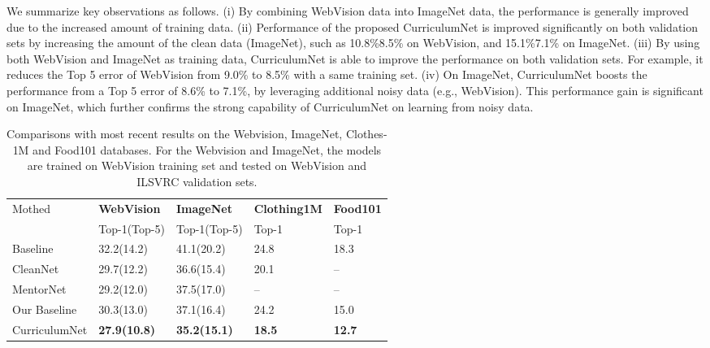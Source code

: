 \documentclass[runningheads]{llncs}
\begin{document}
We summarize key observations as follows. (i) By combining WebVision data into ImageNet data, the performance is generally improved due to the increased amount of training data. (ii) Performance of the proposed CurriculumNet is improved significantly on both validation sets by increasing the amount of the clean data (ImageNet), such as 10.8\%8.5\% on WebVision, and 15.1\%7.1\% on ImageNet. (iii) By using both WebVision and ImageNet as training data, CurriculumNet is able to improve the performance on both validation sets. For example, it reduces the Top 5 error of WebVision from 9.0\% to 8.5\% with a same training set. (iv) On ImageNet, CurriculumNet boosts the performance from a Top 5 error of 8.6\% to 7.1\%, by leveraging additional noisy data (e.g., WebVision). This performance gain is significant on ImageNet, which further confirms the strong capability of CurriculumNet on learning from noisy data.
\begin{table}[tp]
\begin{center}
\caption{Comparisons with most recent results on the Webvision, ImageNet, Clothes-1M and Food101 databases. For the Webvision and ImageNet, the models are trained on WebVision training set and tested on WebVision and ILSVRC validation sets.}
\label{tbl:compar_test}
\vspace{-2mm}
\begin{tabular}{p{2.2cm}|p{2.4cm}<{\centering}|p{2.4cm}<{\centering}|p{2cm}<{\centering}|p{2cm}<{\centering}}
\hline
\multirow{2}{*}{Mothed}& \textbf{ WebVision}& \textbf{ImageNet}& \textbf{Clothing1M}& \textbf{Food101} \\ \cline{2-5}
&Top-1(Top-5)&Top-1(Top-5)&Top-1&Top-1 \\
\hline
Baseline\cite{Lee2017}& 32.2(14.2)& 41.1(20.2)&24.8&18.3 \\
\hline
CleanNet \cite{Lee2017} &29.7(12.2) & 36.6(15.4)&20.1 & -- \\
\hline
MentorNet \cite{jiang2017mentornet} & 29.2(12.0) &37.5(17.0) & -- & -- \\
\hline
\hline
Our Baseline &30.3(13.0) & 37.1(16.4)& 24.2& 15.0 \\
\hline
CurriculumNet & {\bf27.9(10.8) } &{\bf 35.2(15.1)} &{\bf 18.5}& {\bf 12.7} \\
\hline
\end{tabular}


\end{center}
\end{table}
\end{document}
